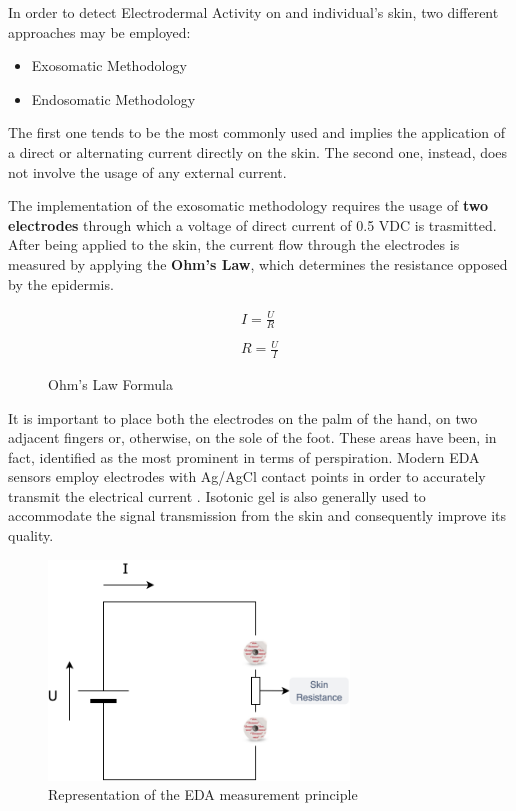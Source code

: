 In order to detect Electrodermal Activity on and individual's skin, two different approaches may be employed:

\begin{itemize}
    \item Exosomatic Methodology
    \item Endosomatic Methodology
\end{itemize}

The first one tends to be the most commonly used and implies the application of a direct or alternating current directly on the skin. The second one, instead, does not involve the usage of any external current.

The implementation of the exosomatic methodology requires the usage of \textbf{two electrodes} through which a voltage of direct current of 0.5 VDC is trasmitted. After being applied to the skin, the current flow through the electrodes is measured by applying the \textbf{Ohm's Law}, which determines the resistance opposed by the epidermis.

\begin{figure}[h]
    \begin{equation}
    \begin{aligned}
    I = \frac{U}{R} \\
    \\
    R = \frac{U}{I}
    \end{aligned}
    \end{equation}
    \caption{Ohm's Law Formula}
    \label{fig:ohmlaw}
\end{figure}

It is important to place both the electrodes on the palm of the hand, on two adjacent fingers or, otherwise, on the sole of the foot. These areas have been, in fact, identified as the most prominent in terms of perspiration. Modern EDA sensors employ electrodes with Ag/AgCl contact points in order to accurately transmit the electrical current \cite{eda-imotions}. Isotonic gel is also generally used to accommodate the signal transmission from the skin and consequently improve its quality.

\begin{figure}[h]
    \centering
    \includegraphics[width=8cm]{./images/skin-resistance.drawio.png}
    \caption{Representation of the EDA measurement principle}
    \label{fig:eda-ans}
\end{figure}

